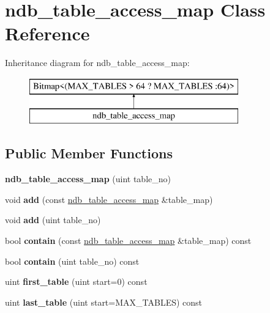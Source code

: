 \hypertarget{classndb__table__access__map}{}\section{ndb\+\_\+table\+\_\+access\+\_\+map Class Reference}
\label{classndb__table__access__map}
Inheritance diagram for ndb\+\_\+table\+\_\+access\+\_\+map\+:\begin{figure}[H]
\begin{center}
\leavevmode
\includegraphics[height=2.000000cm]{classndb__table__access__map}
\end{center}
\end{figure}
\subsection*{Public Member Functions}
\begin{DoxyCompactItemize}
\item 
\mbox{\label{classndb__table__access__map_a882c52e52dab4473cad61a0bc72cafd7}} 
{\bfseries ndb\+\_\+table\+\_\+access\+\_\+map} (uint table\+\_\+no)
\item 
\mbox{\label{classndb__table__access__map_ab05f9944d48d9f1c464ac1754a8b54d4}} 
void {\bfseries add} (const \mbox{\hyperlink{classndb__table__access__map}{ndb\+\_\+table\+\_\+access\+\_\+map}} \&table\+\_\+map)
\item 
\mbox{\label{classndb__table__access__map_a01bd0dc8c43f55bfe001ba58427517e3}} 
void {\bfseries add} (uint table\+\_\+no)
\item 
\mbox{\label{classndb__table__access__map_a9d001cf957afe865697ab5c5a20f4ab9}} 
bool {\bfseries contain} (const \mbox{\hyperlink{classndb__table__access__map}{ndb\+\_\+table\+\_\+access\+\_\+map}} \&table\+\_\+map) const
\item 
\mbox{\label{classndb__table__access__map_a514419b8494df59ef0580b3e1eddf5ac}} 
bool {\bfseries contain} (uint table\+\_\+no) const
\item 
\mbox{\label{classndb__table__access__map_a3d5b80722a29738bacc7b0f8a2644aab}} 
uint {\bfseries first\+\_\+table} (uint start=0) const
\item 
\mbox{\label{classndb__table__access__map_a68dbb604a910af0f49b7885be1f2e6cf}} 
uint {\bfseries last\+\_\+table} (uint start=M\+A\+X\+\_\+\+T\+A\+B\+L\+ES) const
\end{DoxyCompactItemize}
